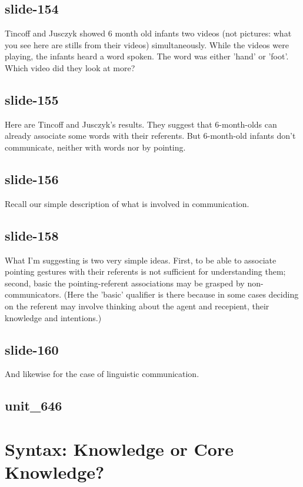 \documentclass[12pt,\papersize]{extarticle}
\begin{document}
 
\subsection{slide-154}
Tincoff and Jusczyk showed 6 month old infants two videos (not pictures: what you see here are stills from their videos) simultaneously.
While the videos were playing, the infants heard a word spoken. The word was either 'hand' or 'foot'.
Which video did they look at more?
 
 
\subsection{slide-155}
Here are Tincoff and Jusczyk's results.
They suggest that 6-month-olds can already associate some words with their referents.
But 6-month-old infants don't communicate, neither with words nor by pointing.
 
 
\subsection{slide-156}
Recall our simple description of what is involved in communication.
 
 
\subsection{slide-158}
What I'm suggesting is two very simple ideas. First, to be able to associate pointing gestures with their referents is not sufficient for understanding them; second, basic the pointing-referent associations may be grasped by non-communicators.
(Here the 'basic' qualifier is there because in some cases deciding on the referent may involve thinking about the agent and recepient, their knowledge and intentions.)
 
 
\subsection{slide-160}
And likewise for the case of linguistic communication.
 
 
\subsection{unit\_646}
 
\section{Syntax: Knowledge or Core Knowledge?}
 
\end{document}
